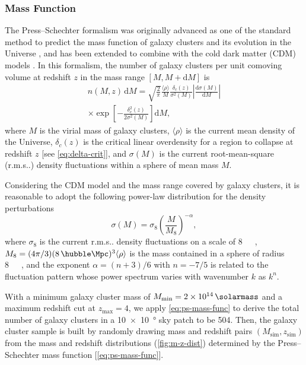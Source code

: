 \documentclass[twocolumn]{aastex62}
\makeatletter
\newcommand{\R}[1]{\mathrm{#1}}
\newcommand{\D}[1]{\R{d} #1}
\newcommand{\diff}[2]{\frac{\D{#1}}{\D{#2}}}
\newcommand{\rms}{r.m.s\@ifnextchar.{}{.\@}}
\newcommand{\editone}[1]{{\leavevmode\color{cyan}#1}}
\makeatother
\begin{document}
\subsubsection{Mass Function}
\label{sec:mass-function}

The Press--Schechter formalism was originally advanced as one of the standard
method to predict the mass function of galaxy clusters and its evolution
in the Universe \citep{press1974}, and has been extended to combine with
the cold dark matter (CDM) models \citep[e.g.,][]{bond1991,lacey1993}.
In this formalism, the number of galaxy clusters per unit comoving volume
at redshift $z$ in the mass range $[M, M + \R{d}M]$ is
\begin{multline}
  \label{eq:ps-mass-func}
  n(M, z) \,\D{M} = \sqrt{\frac{2}{\pi}} \frac{\langle{\rho}\rangle}{M}
  \frac{\delta_c(z)}{\sigma^2(M)} \left| \diff{\sigma(M)}{M} \right| \\
  \times \exp\!\left[ -\frac{\delta_c^2(z)}{2\sigma^2(M)} \right] \D{M},
\end{multline}
where $M$ is the virial mass of galaxy clusters,
$\langle {\rho} \rangle$ is the current mean density of the Universe,
$\delta_c(z)$ is the critical linear overdensity for a region to collapse
at redshift $z$ [see \autoref{eq:delta-crit}],
and $\sigma(M)$ is the current root-mean-square (\rms) density
fluctuations within a sphere of mean mass $M$.

Considering the CDM model and the mass range covered by galaxy clusters,
it is reasonable to adopt the following power-law distribution for the
density perturbations \citep{sarazin2002,randall2002}
\begin{equation}
  \label{eq:sigma-mass}
  \sigma(M) = \sigma_8 \left( \frac{M}{M_8} \right)^{-\alpha},
\end{equation}
where $\sigma_8$ is the current \rms{} density fluctuations on
a scale of \SI{8}{\per\hubble\Mpc},
$M_8 = (4\pi/3)(8 \,\si{\per\hubble\Mpc})^3 \langle{\rho}\rangle$
is the mass contained in a sphere of radius \SI{8}{\per\hubble\Mpc},
and the exponent $\alpha = (n+3)/6$ with $n = -7/5$ \citep{randall2002}
is related to the fluctuation pattern whose power spectrum varies
with wavenumber $k$ as $k^n$.

With a minimum galaxy cluster mass of
$M_{\R{min}} = \SI{2e14}{\solarmass}$
and a maximum redshift cut at $z_{\R{max}} = 4$,
we apply \autoref{eq:ps-mass-func} to derive the total number of
galaxy clusters \editone{in a \SI[product-units=repeat]{10 x 10}{\degree}
sky patch to be \num{504}}.
Then, the galaxy cluster sample is built by randomly drawing mass and
redshift pairs $(M_{\R{sim}}, z_{\R{sim}})$ from the
\editone{%
mass and redshift distributions (\autoref{fig:m-z-dist}) determined by the
Press--Schechter mass function [\autoref{eq:ps-mass-func}].}
\end{document}
